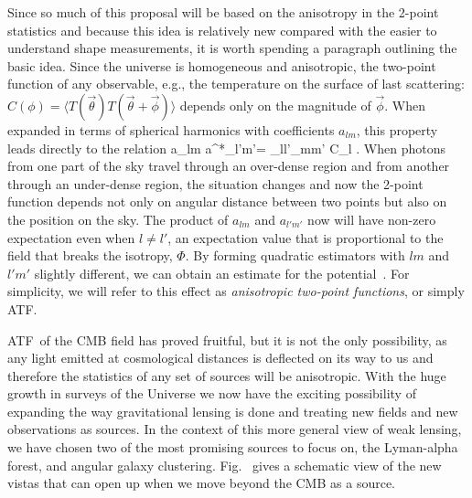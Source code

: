 \newcommand\atf{ATF}
Since so much of this proposal will be based on the anisotropy in the 2-point statistics and because this idea is relatively new \citep{Hu:2001tn} compared with the easier to understand shape measurements, it is worth spending a paragraph outlining the basic idea. Since the universe is homogeneous and anisotropic, the two-point function of any observable, e.g., the temperature on the surface of last scattering: $C(\phi)=\langle T(\vec \theta)T(\vec\theta+\vec{\phi})\rangle$ depends only on the magnitude of $\vec\phi$. When expanded in terms of spherical harmonics with coefficients $a_{lm}$, this property leads directly to the relation
\be
\langle a_{lm} a^*_{l'm'}\rangle = \delta_{ll'}\delta_{mm'} C_l
.\ee
When photons from one part of the sky travel through an over-dense region and from another through an under-dense region, the situation changes and now the 2-point function depends not only on angular distance between two points but also on the position on the sky. The product of $a_{lm}$ and $a_{l'm'}$ now will have non-zero expectation even when $l\ne l'$, an expectation value that is proportional to the field that breaks the isotropy, $\Phi$. By forming quadratic estimators with $lm$ and $l'm'$ slightly different, we can obtain an estimate for the potential~\citep{Hu:2001tn,okamoto}. For simplicity, we will refer to this effect as {\it anisotropic two-point functions}, or simply \atf.
 
\atf\ of the CMB field has proved fruitful, but it is not the only possibility, as any light emitted
at cosmological distances is deflected on its way to us and therefore the statistics of any set of sources will be anisotropic. With the huge
growth in surveys of the Universe we now have the exciting possibility
of expanding the way gravitational lensing is done and treating new
fields and new observations as sources. In the context of this more general
view of weak lensing, we have chosen two of the most
promising sources to focus on, the Lyman-alpha forest, and 
angular galaxy clustering. Fig.~ gives a schematic view of the new vistas that can open up when we move beyond the CMB as a source.

